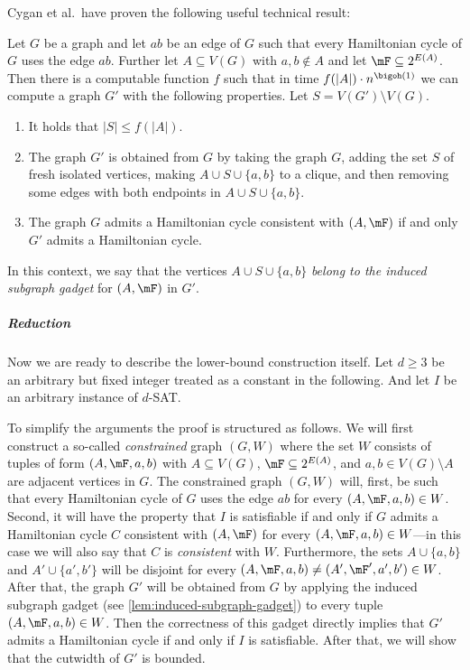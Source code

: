 \documentclass[a4paper,UKenglish,cleveref, autoref, thm-restate]{lipics-v2021}
\begin{document}
Cygan et al.\ have proven the following useful technical result:
\begin{lemma}\label{lem:induced-subgraph-gadget}
	Let $G$ be a graph and let $ab$ be an edge of $G$ such that every Hamiltonian cycle of $G$ uses the edge $ab$.
	Further let $A \subseteq V(G)$ with $a, b \notin A$ and let $\mF \subseteq 2^{E(A)}$. 
	Then there is a computable function $f$ such that in time $f(|A|) \cdot n^{\bigoh(1)}$ we can compute a graph $G'$ with the following properties.
	Let $S = V(G') \setminus V(G)$.
	\begin{enumerate}
	 \item It holds that $|S| \leq f(|A|)$.
	 \item The graph $G'$ is obtained from $G$ by taking the graph $G$, adding the set $S$ of fresh isolated vertices, making $A \cup S \cup \{a, b\}$ to a clique, and then removing some edges with both endpoints in $A \cup S \cup \{a, b\}$.
	 \item The graph $G$ admits a Hamiltonian cycle consistent with $(A, \mF)$ if and only $G'$ admits a Hamiltonian cycle.
	\end{enumerate}
	In this context, we say that the vertices $A \cup S \cup \{a, b\}$ \emph{belong to the induced subgraph gadget} for $(A, \mF)$ in $G'$.
\end{lemma}

\subparagraph*{Reduction}

Now we are ready to describe the lower-bound construction itself.
Let $d \geq 3$ be an arbitrary but fixed integer treated as a constant in the following.
And let $I$ be an arbitrary instance of $d$-\textsc{SAT}.

To simplify the arguments the proof is structured as follows.
We will first construct a so-called \emph{constrained} graph $(G, W)$ where the set $W$ consists of tuples of form $(A, \mF, a, b)$ with $A \subseteq V(G)$, $\mF \subseteq 2^{E(A)}$, and $a,b \in V(G) \setminus A$ are adjacent vertices in $G$.
The constrained graph $(G, W)$ will, first, be such that every Hamiltonian cycle of $G$ uses the edge $ab$ for every $(A, \mF, a, b) \in W$.
Second, it will have the property that $I$ is satisfiable if and only if $G$ admits a Hamiltonian cycle $C$ consistent with $(A, \mF)$ for every $(A, \mF, a, b) \in W$---in this case we will also say that $C$ is \emph{consistent} with $W$.
Furthermore, the sets $A \cup \{a, b\}$ and $A' \cup \{a', b'\}$ will be disjoint for every $(A, \mF, a, b) \neq (A', \mF', a', b') \in W$. 
After that, the graph $G'$ will be obtained from $G$ by applying the induced subgraph gadget (see \cref{lem:induced-subgraph-gadget}) to every tuple $(A, \mF, a, b) \in W$.
Then the correctness of this gadget directly implies that $G'$ admits a Hamiltonian cycle if and only if $I$ is satisfiable.
After that, we will show that the cutwidth of $G'$ is bounded.
\end{document}
